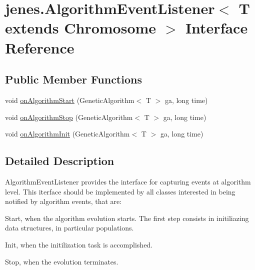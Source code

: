 \hypertarget{interfacejenes_1_1_algorithm_event_listener_3_01_t_01extends_01_chromosome_01_4}{\section{jenes.\-Algorithm\-Event\-Listener$<$ T extends Chromosome $>$ Interface Reference}
\label{interfacejenes_1_1_algorithm_event_listener_3_01_t_01extends_01_chromosome_01_4}
}
\subsection*{Public Member Functions}
\begin{DoxyCompactItemize}
\item 
void \hyperlink{interfacejenes_1_1_algorithm_event_listener_3_01_t_01extends_01_chromosome_01_4_af0d6e9961e685f4d44270a4feedeb70f}{on\-Algorithm\-Start} (Genetic\-Algorithm$<$ T $>$ ga, long time)
\item 
void \hyperlink{interfacejenes_1_1_algorithm_event_listener_3_01_t_01extends_01_chromosome_01_4_ab494ea60f6000ebcd02a94c7eda70dcf}{on\-Algorithm\-Stop} (Genetic\-Algorithm$<$ T $>$ ga, long time)
\item 
void \hyperlink{interfacejenes_1_1_algorithm_event_listener_3_01_t_01extends_01_chromosome_01_4_af5f6bb7f487c9ecd01331427a370889e}{on\-Algorithm\-Init} (Genetic\-Algorithm$<$ T $>$ ga, long time)
\end{DoxyCompactItemize}


\subsection{Detailed Description}
{\ttfamily Algorithm\-Event\-Listener} provides the interface for capturing events at algorithm level. This iterface should be implemented by all classes interested in being notified by algorithm events, that are\-: 
\begin{DoxyItemize}
\item Start, when the algorithm evolution starts. The first step consists in initiliazing data structures, in particular populations. 
\item Init, when the initilization task is accomplished. 
\item Stop, when the evolution terminates. 
\end{DoxyItemize}


